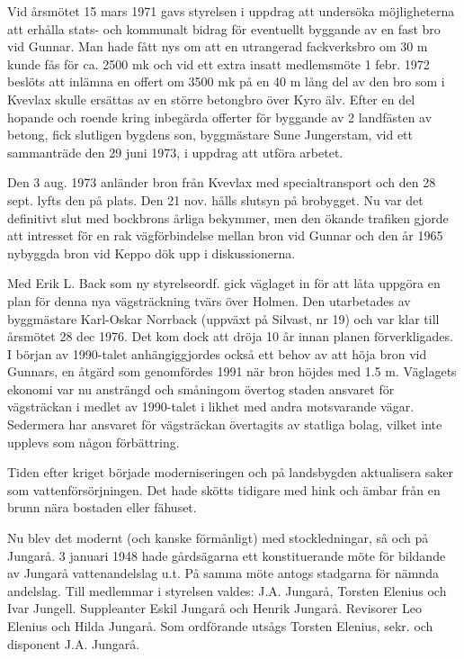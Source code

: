 
Vid årsmötet 15 mars 1971 gavs styrelsen i uppdrag att undersöka möjligheterna att erhålla stats- och kommunalt bidrag för eventuellt byggande av en fast bro vid Gunnar. Man hade fått nys om att en utrangerad fackverksbro om 30 m kunde fås för ca. 2500 mk och vid ett extra insatt medlemsmöte 1 febr. 1972 beslöts att inlämna en offert om 3500 mk på en 40 m lång del av den bro som i Kvevlax skulle ersättas av en större  betongbro över Kyro älv. Efter en del hopande och roende kring inbegärda offerter för byggande av 2 landfästen av betong, fick slutligen bygdens son, byggmästare Sune Jungerstam, vid ett sammanträde den 29 juni 1973, i uppdrag att utföra arbetet.

Den 3 aug. 1973 anländer bron från Kvevlax med specialtransport och den 28 sept. lyfts den på plats. Den 21 nov. hålls slutsyn på brobygget. Nu var det definitivt slut med bockbrons årliga bekymmer, men den ökande trafiken gjorde att intresset för en rak vägförbindelse mellan bron vid Gunnar och den år 1965 nybyggda bron vid Keppo dök upp i diskussionerna.

Med Erik L. Back som ny styrelseordf. gick väglaget in för att låta uppgöra en plan för denna nya vägsträckning tvärs över Holmen. Den utarbetades av byggmästare Karl-Oskar Norrback (uppväxt på Silvast, nr 19) och var klar till årsmötet 28 dec 1976. Det kom dock att dröja 10 år innan planen förverkligades. I början av 1990-talet anhängiggjordes också ett behov av att höja bron vid Gunnars, en åtgärd som genomfördes 1991 när bron höjdes med 1.5 m. Väglagets ekonomi var nu ansträngd och småningom övertog staden ansvaret för vägsträckan i medlet av 1990-talet i likhet med andra motsvarande vägar. Sedermera har ansvaret för vägsträckan övertagits av statliga bolag, vilket inte upplevs som någon förbättring.




Tiden efter kriget började moderniseringen och på landsbygden aktualisera saker som vattenförsörjningen. Det hade skötts tidigare med hink och ämbar från en brunn nära bostaden eller fähuset.

Nu blev det modernt (och kanske förmånligt) med stockledningar, så och på Jungarå. 3 januari 1948 hade gårdsägarna ett konstituerande möte för bildande av Jungarå vattenandelslag u.t. På samma möte antogs stadgarna för nämnda andelslag. Till medlemmar i styrelsen valdes: J.A. Jungarå, Torsten Elenius och Ivar Jungell. Suppleanter Eskil Jungarå och Henrik Jungarå. Revisorer Leo Elenius och Hilda Jungarå. Som ordförande utsågs Torsten Elenius, sekr. och disponent J.A. Jungarå.


